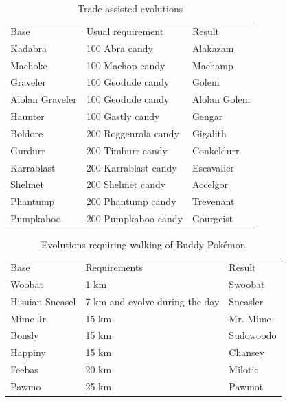 \begin{table}
\footnotesize
\centering
\begin{tabular}{lll}
  Base & Usual requirement & Result \\
\Midrule
Kadabra & 100 Abra candy & Alakazam\\
Machoke & 100 Machop candy & Machamp\\
  Graveler & 100 Geodude candy & Golem\\
  Alolan Graveler & 100 Geodude candy & Alolan Golem\\
  Haunter & 100 Gastly candy & Gengar\\
  Boldore & 200 Roggenrola candy & Gigalith\\
  Gurdurr & 200 Timburr candy & Conkeldurr\\
  Karrablast & 200 Karrablast candy & Escavalier\\
  Shelmet & 200 Shelmet candy & Accelgor\\
  Phantump & 200 Phantump candy & Trevenant\\
  Pumpkaboo & 200 Pumpkaboo candy & Gourgeist\\
\end{tabular}
  \caption{Trade-assisted evolutions\label{table:tradeevolution}}
\end{table}
\begin{table}
\footnotesize
\centering
\begin{tabular}{lll}
  Base & Requirements & Result \\
\Midrule
  Woobat & 1 km & Swoobat\\
  Hisuian Sneasel & 7 km and evolve during the day & Sneasler\\
  Mime Jr. & 15 km & Mr. Mime\\
  Bonsly & 15 km & Sudowoodo\\
  Happiny & 15 km & Chansey\\
  Feebas & 20 km & Milotic\\
  Pawmo & 25 km & Pawmot\\
\end{tabular}
  \caption{Evolutions requiring walking of Buddy Pokémon\label{table:walkevolutions}}
\end{table}
